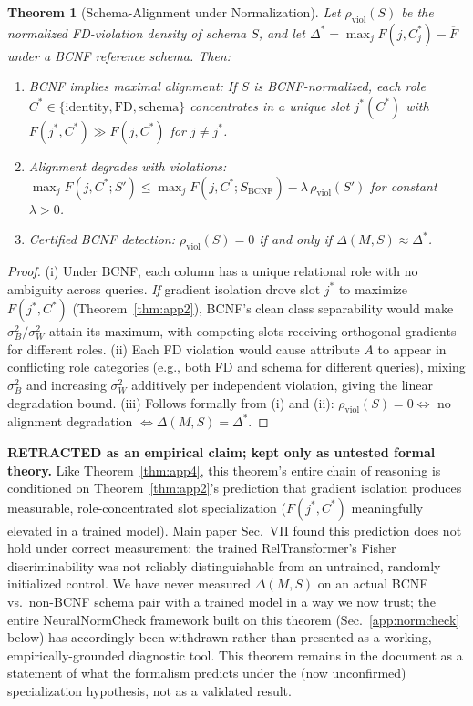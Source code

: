 \documentclass[conference]{IEEEtran}
\newtheorem{theorem}{Theorem}
\begin{document}
\begin{theorem}[Schema-Alignment under Normalization]
\label{thm:app9}
Let $\rho_{\mathrm{viol}}(S)$ be the normalized FD-violation density of schema $S$, and let $\Delta^* = \max_j F(j, C^*_j) - \overline{F}$ under a BCNF reference schema. Then:
\begin{enumerate}[label=\textup{(\roman*)},noitemsep,topsep=2pt]
  \item \emph{BCNF implies maximal alignment}: If $S$ is BCNF-normalized, each role $C^* \in \{\mathrm{identity, FD, schema}\}$ concentrates in a unique slot $j^*(C^*)$ with $F(j^*, C^*) \gg F(j, C^*)$ for $j \neq j^*$.
  \item \emph{Alignment degrades with violations}: $\max_j F(j, C^*; S') \leq \max_j F(j, C^*; S_{\mathrm{BCNF}}) - \lambda\,\rho_{\mathrm{viol}}(S')$ for constant $\lambda > 0$.
  \item \emph{Certified BCNF detection}: $\rho_{\mathrm{viol}}(S) = 0$ if and only if $\Delta(M, S) \approx \Delta^*$.
\end{enumerate}
\end{theorem}
\begin{proof}
	\renewcommand{\qedsymbol}{}
(i) Under BCNF, each column has a unique relational role with no ambiguity across queries. \emph{If} gradient isolation drove slot $j^*$ to maximize $F(j^*, C^*)$ (Theorem~\ref{thm:app2}), BCNF's clean class separability would make $\sigma_B^2/\sigma_W^2$ attain its maximum, with competing slots receiving orthogonal gradients for different roles. (ii) Each FD violation would cause attribute $A$ to appear in conflicting role categories (e.g., both FD and schema for different queries), mixing $\sigma_B^2$ and increasing $\sigma_W^2$ additively per independent violation, giving the linear degradation bound. (iii) Follows formally from (i) and (ii): $\rho_{\mathrm{viol}}(S) = 0 \Leftrightarrow$ no alignment degradation $\Leftrightarrow \Delta(M,S) = \Delta^*$.
\end{proof}

\textbf{RETRACTED as an empirical claim; kept only as untested formal theory.} Like Theorem~\ref{thm:app4}, this theorem's entire chain of reasoning is conditioned on Theorem~\ref{thm:app2}'s prediction that gradient isolation produces measurable, role-concentrated slot specialization ($F(j^*,C^*)$ meaningfully elevated in a trained model). Main paper Sec.~VII found this prediction does not hold under correct measurement: the trained RelTransformer's Fisher discriminability was not reliably distinguishable from an untrained, randomly initialized control. We have never measured $\Delta(M,S)$ on an actual BCNF vs.\ non-BCNF schema pair with a trained model in a way we now trust; the entire NeuralNormCheck framework built on this theorem (Sec.~\ref{app:normcheck} below) has accordingly been withdrawn rather than presented as a working, empirically-grounded diagnostic tool. This theorem remains in the document as a statement of what the formalism predicts under the (now unconfirmed) specialization hypothesis, not as a validated result.
\end{document}
